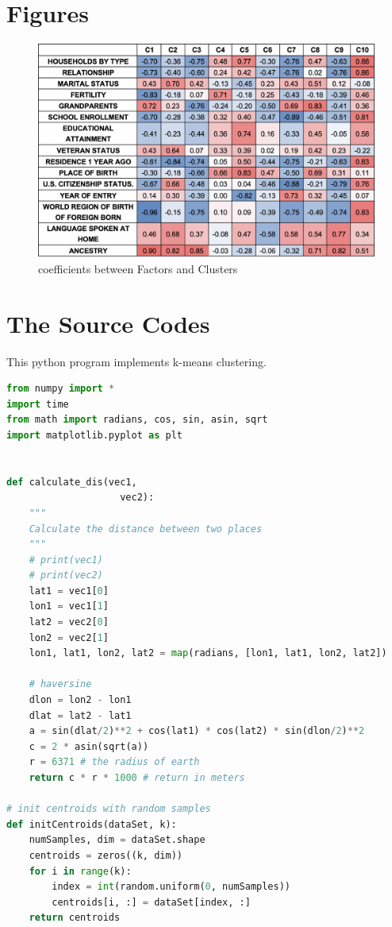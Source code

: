 \documentclass[12pt]{article}
\begin{document}
\clearpage
\begin{appendices}
\section{Figures}
\begin{figure}[H]
	\centering
	\includegraphics[scale=0.5]{./figures/a1.png}
	\caption{coefficients between Factors and Clusters}
\end{figure}

\section{The Source Codes}		%


This python program implements k-means clustering.
\begin{lstlisting}[language={python}, caption=\texttt{k-means.py}]
from numpy import *
import time
from math import radians, cos, sin, asin, sqrt
import matplotlib.pyplot as plt
	

def calculate_dis(vec1,
					vec2):
	"""
	Calculate the distance between two places
	"""
	# print(vec1)
	# print(vec2)
	lat1 = vec1[0]
	lon1 = vec1[1]
	lat2 = vec2[0]
	lon2 = vec2[1]
	lon1, lat1, lon2, lat2 = map(radians, [lon1, lat1, lon2, lat2])
	
	# haversine
	dlon = lon2 - lon1 
	dlat = lat2 - lat1 
	a = sin(dlat/2)**2 + cos(lat1) * cos(lat2) * sin(dlon/2)**2
	c = 2 * asin(sqrt(a)) 
	r = 6371 # the radius of earth
	return c * r * 1000 # return in meters
	
# init centroids with random samples
def initCentroids(dataSet, k):
	numSamples, dim = dataSet.shape
	centroids = zeros((k, dim))
	for i in range(k):
		index = int(random.uniform(0, numSamples))
		centroids[i, :] = dataSet[index, :]
	return centroids
	

\end{lstlisting}
\end{appendices}
\end{document}
